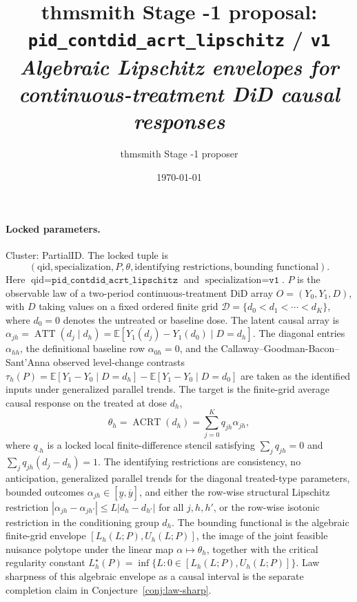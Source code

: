 \documentclass[11pt]{article}
\title{thmsmith Stage -1 proposal: \texttt{pid\_contdid\_acrt\_lipschitz} / \texttt{v1}%
  \\ \large\textit{Algebraic Lipschitz envelopes for continuous-treatment DiD causal responses}}
\author{thmsmith Stage -1 proposer}
\date{\today}
\newcommand{\E}{\mathbb{E}}
\theoremstyle{definition}
\theoremstyle{plain}
\theoremstyle{remark}
\begin{document}
\maketitle


\paragraph{Locked parameters.}
Cluster: PartialID.  The locked tuple is
\[
  (\text{qid},\text{specialization},P,\theta,\text{identifying restrictions},
  \text{bounding functional}).
\]
Here \(\text{qid}=\texttt{pid\_contdid\_acrt\_lipschitz}\) and
\(\text{specialization}=\texttt{v1}\).  \(P\) is the observable law of a
two-period continuous-treatment DiD array \(O=(Y_0,Y_1,D)\), with \(D\) taking
values on a fixed ordered finite grid
\(\mathcal D=\{d_0<d_1<\cdots<d_K\}\), where \(d_0=0\) denotes the untreated or
baseline dose.  The latent causal array is
\(\alpha_{j h}=\operatorname{ATT}(d_j\mid d_h)
=\E[Y_1(d_j)-Y_1(d_0)\mid D=d_h]\).  The diagonal entries
\(\alpha_{h h}\), the definitional baseline row \(\alpha_{0h}=0\), and the
Callaway--Goodman-Bacon--Sant'Anna observed level-change contrasts
\(\tau_h(P)=\E[Y_1-Y_0\mid D=d_h]-\E[Y_1-Y_0\mid D=d_0]\) are taken as the
identified inputs under generalized parallel trends.  The target is the
finite-grid average causal response on the
treated at dose \(d_h\),
\[
  \theta_h=\operatorname{ACRT}(d_h)
  =\sum_{j=0}^K q_{j h}\alpha_{j h},
\]
where \(q_{\cdot h}\) is a locked local finite-difference stencil satisfying
\(\sum_jq_{j h}=0\) and \(\sum_jq_{j h}(d_j-d_h)=1\).  The identifying
restrictions are consistency, no anticipation, generalized parallel trends for
the diagonal treated-type parameters, bounded outcomes
\(\alpha_{j h}\in[\underline y,\overline y]\), and either the row-wise
structural Lipschitz restriction
\(|\alpha_{j h}-\alpha_{j h'}|\le L|d_h-d_{h'}|\) for all \(j,h,h'\), or the
row-wise isotonic restriction in the conditioning group \(d_h\).  The bounding
functional is the algebraic finite-grid envelope
\([L_h(L;P),U_h(L;P)]\), the image of the joint feasible nuisance polytope under
the linear map \(\alpha\mapsto\theta_h\), together with the critical regularity
constant \(L_h^\star(P)=\inf\{L:0\in[L_h(L;P),U_h(L;P)]\}\).
Law sharpness of this algebraic envelope as a causal interval is the
separate completion claim in Conjecture~\ref{conj:law-sharp}.
\end{document}

